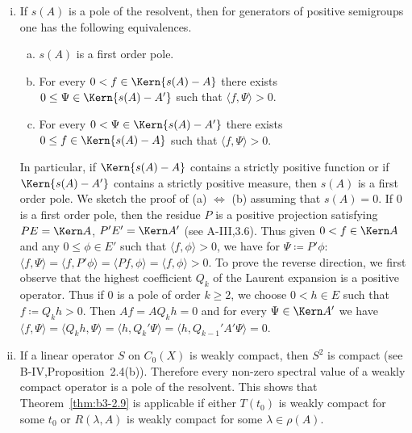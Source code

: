 \begin{remarks}\label{rem:b3-2.15}
	
	\begin{enumerate}[(i), wide]
	\item
	If $s(A)$ is a pole of the resolvent, then for generators of positive semigroups one has the following equivalences.
	
	\begin{enumerate}[(a)]
		\item 
		$s(A)$ is a first order pole.
		
		\item 
		For every $0 < f \in \Kern{s(A) - A}$ there exists $0 \leq \Psi \in \Kern{s(A) - A'}$ such that $\langle f,\Psi \rangle > 0$.
		
		\item 
		For every $0 < \Psi \in \Kern{s(A) - A'}$ there exists $0 \leq f \in \Kern{s(A) - A}$ such that $\langle f,\Psi \rangle > 0$.
	\end{enumerate}
	In particular, if $\Kern{s(A) - A}$ contains a strictly positive function or if $\Kern{s(A) - A'}$ contains a strictly positive measure, then $s(A)$ is a first order pole.
%
%	
%
%
	We sketch the proof of (a) $\Leftrightarrow$ (b) assuming that $s(A) = 0$.
	If $0$ is a first order pole, then the residue $P$ is a positive projection satisfying $PE = \Kern A$, $P'E' = \Kern A'$ (see A-III,3.6).
	Thus given $0 < f \in \Kern A$ and any $0 \leq \phi \in E'$ such that $\langle f,\phi \rangle > 0$, we have for $\Psi \coloneqq P'\phi$: $\langle f,\Psi \rangle = \langle f,P'\phi \rangle = \langle Pf,\phi \rangle = \langle f,\phi \rangle > 0$.
	To prove the reverse direction, we first observe that the highest coefficient $Q_{k}$ of the Laurent expansion is a positive operator.
	Thus if $0$ is a pole of order $k \geq 2$, we choose $0 < h \in E$ such that $f \coloneqq Q_{k}h > 0$.
	Then $Af = AQ_{k}h = 0$ and for every $\Psi \in \Kern A'$ we have $\langle f,\Psi \rangle = \langle Q_{k}h,\Psi \rangle = \langle h,Q_{k}'\Psi \rangle = \langle h,Q_{k-1}'A'\Psi \rangle = 0$.
	\item 
	If a linear operator $S$ on $C_{0}(X)$ is weakly compact, then $S^{2}$ is compact (see B-IV,Proposition~2.4(b)).
	Therefore every non-zero spectral value of a weakly compact operator is a pole of the resolvent.
	This shows that Theorem~\ref{thm:b3-2.9} is applicable if either $T(t_{0})$ is weakly compact for some $t_{0}$ or $R(\lambda,A)$ is weakly compact for some $\lambda \in \rho(A)$.

\end{enumerate}
\end{remarks}
